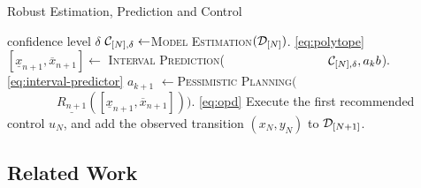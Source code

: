 \documentclass{article}
\begin{document}

\begin{algorithm}[tb]
	\caption{Robust Estimation, Prediction and Control}
	\label{alg:full}
	\begin{algorithmic}
		 confidence level $\delta$
		\STATE $\mathcal{C}_{[N],\delta} \gets$\textsc{Model Estimation}$(\mathcal{D}_{[N]})$. \eqref{eq:polytope}
		\STATE $[\underline{x}_{n+1}, \overline{x}_{n+1}]\gets$ \textsc{Interval Prediction}(
		\STATE $\qquad\qquad\qquad\qquad\mathcal{C}_{[N],\delta}, a_kb$). \eqref{eq:interval-predictor}
		\ENDFOR
		\STATE $a_{k+1}$ $\gets$\textsc{Pessimistic Planning}$($
		\STATE$\qquad\qquad\underline{R_{n+1}}([\underline{x}_{n+1}, \overline{x}_{n+1}]))$.  \eqref{eq:opd}
		\ENDFOR
		\STATE Execute the first recommended control $u_N$, and add the observed transition $(x_N, y_N)$ to $\mathcal{D}_{[N+1]}$.
		\ENDFOR
	\end{algorithmic}
\end{algorithm}


\subsection{Related Work}
\end{document}
